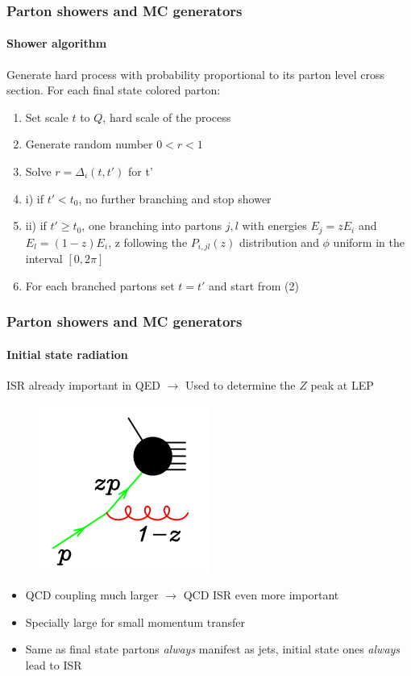 \documentclass[aspectratio=43]{beamer}
\begin{document}
\begin{frame}

	\frametitle{Parton showers and MC generators}
	\framesubtitle{Shower algorithm}
	
	Generate hard process with probability proportional to its parton level cross section. For each final state colored parton:
	\begin{enumerate} 
		\item Set scale $t$ to $Q$, hard scale of the process
		\item Generate random number $0 < r < 1$
		\item Solve $r = \Delta_{i}(t, t')$ for t'
		\item i) if $t' < t_{0}$, no further branching and stop shower
		\item ii) if $t' \geq t_{0}$, one branching into partons $j, l$ with energies $E_{j} = zE_{i}$ and $E_{l} = (1 - z)E_{i}$, z following the $P_{i, jl}(z)$ distribution and $\phi$ uniform in the interval $[0, 2\pi]$
		\item For each branched partons set $t = t'$ and start from (2)
	\end{enumerate}

\end{frame}

\begin{frame}

	\frametitle{Parton showers and MC generators}
	\framesubtitle{Initial state radiation}
	
	ISR already important in QED $\longrightarrow$ Used to determine the $Z$ peak at LEP
	\begin{figure}
		\includegraphics[width = 3 cm]{plots/shower_ISR.png}
	\end{figure}
	
	\begin{itemize}
		\item QCD coupling much larger $\longrightarrow$ QCD ISR even more important
		\item Specially large for small momentum transfer
		\item Same as final state partons \textit{always} manifest as jets, initial state ones \textit{always} lead to ISR
	\end{itemize}
	
\end{frame}
\end{document}
